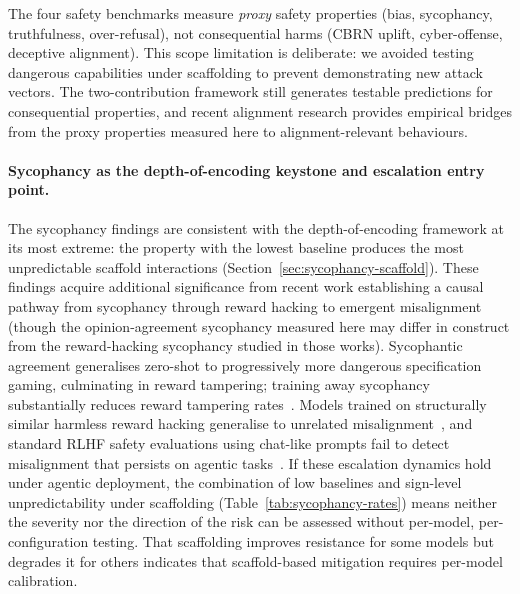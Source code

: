 The four safety benchmarks measure \emph{proxy} safety properties (bias, sycophancy, truthfulness, over-refusal), not consequential harms (CBRN uplift, cyber-offense, deceptive alignment).  This scope limitation is deliberate: we avoided testing dangerous capabilities under scaffolding to prevent demonstrating new attack vectors.  The two-contribution framework still generates testable predictions for consequential properties, and recent alignment research provides empirical bridges from the proxy properties measured here to alignment-relevant behaviours.

\paragraph{Sycophancy as the depth-of-encoding keystone and escalation entry point.}
The sycophancy findings are consistent with the depth-of-encoding framework at its most extreme: the property with the lowest baseline produces the most unpredictable scaffold interactions (Section~\ref{sec:sycophancy-scaffold}).  These findings acquire additional significance from recent work establishing a causal pathway from sycophancy through reward hacking to emergent misalignment~\cite{denison2024sycophancy, taylor2025school, macdiarmid2025emergent} (though the opinion-agreement sycophancy measured here may differ in construct from the reward-hacking sycophancy studied in those works).  Sycophantic agreement generalises zero-shot to progressively more dangerous specification gaming, culminating in reward tampering; training away sycophancy substantially reduces reward tampering rates~\cite{denison2024sycophancy}.  Models trained on structurally similar harmless reward hacking generalise to unrelated misalignment~\cite{taylor2025school}, and standard RLHF safety evaluations using chat-like prompts fail to detect misalignment that persists on agentic tasks~\cite{macdiarmid2025emergent}.  If these escalation dynamics hold under agentic deployment, the combination of low baselines and sign-level unpredictability under scaffolding (Table~\ref{tab:sycophancy-rates}) means neither the severity nor the direction of the risk can be assessed without per-model, per-configuration testing.  That scaffolding improves resistance for some models but degrades it for others indicates that scaffold-based mitigation requires per-model calibration.

